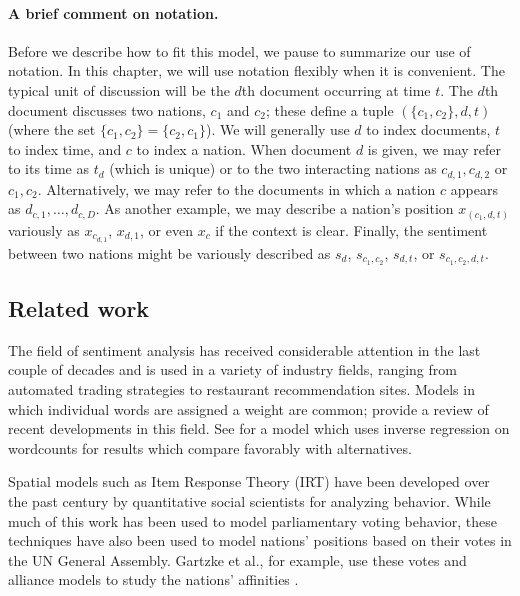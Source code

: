 \paragraph{A brief comment on notation.} Before we describe how to fit
this model, we pause to summarize our use of notation.  In this
chapter, we will use notation flexibly when it is convenient.  The
typical unit of discussion will be the $d$th document occurring at
time $t$.  The $d$th document discusses two nations, $c_1$ and
$c_2$; these define a tuple $(\{ c_1, c_2 \}, d, t)$ (where the set
$\{ c_1, c_2 \} = \{ c_2, c_1 \}$).  We will generally use $d$ to
index documents, $t$ to index time, and $c$ to index a nation.  When
document $d$ is given, we may refer to its time as $t_d$ (which is
unique) or to the two interacting nations as $c_{d,1},c_{d,2}$ or
$c_1,c_2$.  Alternatively, we may refer to the documents in which a
nation $c$ appears as $d_{c,1}, \ldots, d_{c,D}$.  As another
example, we may describe a nation's position $x_{(c_1,d,t)}$
variously as $x_{c_{d,1}}$, $x_{d,1}$, or even $x_c$ if the context is
clear. Finally, the sentiment between two nations might be variously
described as $s_d$, $s_{c_1,c_2}$, $s_{d,t}$, or $s_{c_1,c_2,d,t}$.

\subsection{Related work}

The field of sentiment analysis has received considerable attention in
the last couple of decades and is used in a variety of industry
fields, ranging from automated trading strategies to restaurant
recommendation sites.  Models in which individual words are assigned a
weight are common; \cite{pang:2008} provide a review of recent
developments in this field.  See \cite{taddy:2012} for a model which
uses inverse regression on wordcounts for results which compare
favorably with alternatives.

Spatial models such as Item Response Theory (IRT) have been developed
over the past century by quantitative social scientists for analyzing
behavior.  While much of this work has been used to model
parliamentary voting behavior, these techniques have also been used to
model nations' positions based on their votes in the UN General
Assembly. Gartzke et al., for example, use these votes and alliance
models to study the nations' affinities \citep{gartzke:1998}.

